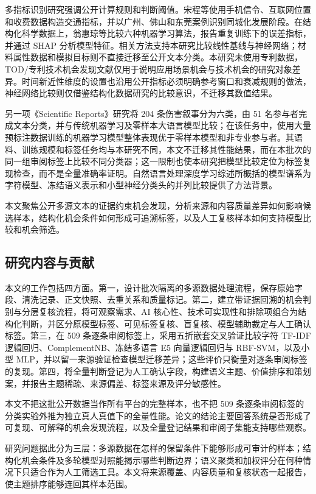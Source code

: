 多指标识别研究强调公开计算规则和判断阈值。宋程等使用手机信令、互联网位置和收费数据构造交通指标，并以广州、佛山和东莞案例识别同城化发展阶段\cite{song2020urban}。在结构化科学数据上，翁惠琼等比较六种机器学习算法，报告重复训练下的误差指标，并通过 SHAP 分析模型特征\cite{weng2026mof}。相关方法支持本研究比较线性基线与神经网络；材料属性数据和模拟目标则不直接迁移至公开文本分类。本研究未使用专利数据，TOD/专利技术机会发现文献仅用于说明应用场景机会与技术机会的研究对象差异。时间新近性维度的设置也沿用公开指标必须明确参考窗口和衰减规则的做法\cite{song2020urban}，神经网络比较则仅借鉴结构化数据研究的比较意识，不迁移其数值结果\cite{weng2026mof}。

另一项《Scientific Reports》研究将 204 条伤害叙事分为六类，由 51 名参与者完成文本分类，并与传统机器学习及零样本大语言模型比较；在该任务中，使用大量预标注数据训练的机器学习模型整体表现优于零样本模型和非专业参与者\cite{venkatesh2024classification}。其语料、训练规模和标签任务均与本研究不同，本文不迁移其性能结果，而在本批次的同一组审阅标签上比较不同分类器；这一限制也使本研究把模型比较定位为标签复现检查，而不是全量准确率证明\cite{venkatesh2024classification}。自然语言处理深度学习综述所概括的模型谱系为字符模型、冻结语义表示和小型神经分类头的并列比较提供了方法背景\cite{he2025nlp}。

本文聚焦公开多源文本的证据约束机会发现，分析来源和内容质量差异如何影响候选样本，结构化机会条件如何形成可追溯标签，以及人工复核样本如何支持模型比较和机会筛选。

\subsection{研究内容与贡献}

本文的工作包括四方面。第一，设计批次隔离的多源数据处理流程，保存原始字段、清洗记录、正文快照、去重关系和质量标记。第二，建立带证据回溯的机会判别与分层复核流程，将可观察需求、AI 核心性、技术可实现性和排除项组合为结构化判断，并区分原模型标签、可见标签复核、盲复核、模型辅助裁定与人工确认标签。第三，在 509 条逐条审阅标签上，采用五折嵌套交叉验证比较字符 TF-IDF 逻辑回归、ComplementNB、冻结多语言 E5 向量逻辑回归与 RBF-SVM，以及小型 MLP，并以留一来源验证检查模型迁移差异；这些评价只衡量对逐条审阅标签的复现。第四，将全量判断登记为人工确认字段，构建语义主题、价值排序和策划案，并报告主题稀疏、来源偏差、标签来源及评分敏感性。

本文不把这批公开数据当作所有平台的完整样本，也不把 509 条逐条审阅标签的分类实验外推为独立真人真值下的全量性能。论文的结论主要回答系统是否形成了可复现、可解释的机会发现流程，以及全量登记结果和审阅子集能支持哪些观察。

研究问题据此分为三层：多源数据在怎样的保留条件下能够形成可审计的样本；结构化机会条件及多轮模型对照能揭示哪些判断边界；语义聚类和加权评分在何种情况下只适合作为人工筛选工具。本文将来源覆盖、内容质量和复核状态一起报告，使主题排序能够连回其样本范围。
